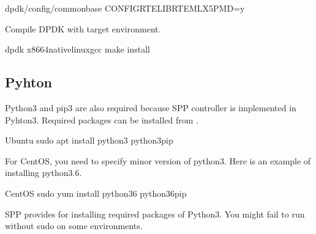 \documentclass[a4paper,11pt,openany,oneside,english]{sphinxmanual}
\begin{document}
\begin{sphinxVerbatim}[commandchars=\\\{\},formatcom=\footnotesize]
\PYGZsh{} dpdk/config/common\PYGZus{}base
CONFIG\PYGZus{}RTE\PYGZus{}LIBRTE\PYGZus{}MLX5\PYGZus{}PMD=y
\end{sphinxVerbatim}

Compile DPDK with target environment.

\begin{sphinxVerbatim}[commandchars=\\\{\},formatcom=\footnotesize]
  dpdk
  
  x86\PYGZus{}64\PYGZhy{}native\PYGZhy{}linux\PYGZhy{}gcc  
 make install 
\end{sphinxVerbatim}


\subsection{Pyhton}
\label{\detokenize{gsg/install:pyhton}}
Python3 and pip3 are also required because SPP controller is implemented
in Pyhton3. Required packages can be installed from .

\begin{sphinxVerbatim}[commandchars=\\\{\},formatcom=\footnotesize]
 Ubuntu
 sudo apt install python3 
  python3\PYGZhy{}pip
\end{sphinxVerbatim}

For CentOS, you need to specify minor version of python3.
Here is an example of installing python3.6.

\begin{sphinxVerbatim}[commandchars=\\\{\},formatcom=\footnotesize]
 CentOS
 sudo yum install python36 
  python36\PYGZhy{}pip
\end{sphinxVerbatim}

SPP provides  for installing required packages of Python3.
You might fail to run  without sudo on some environments.
\end{document}
